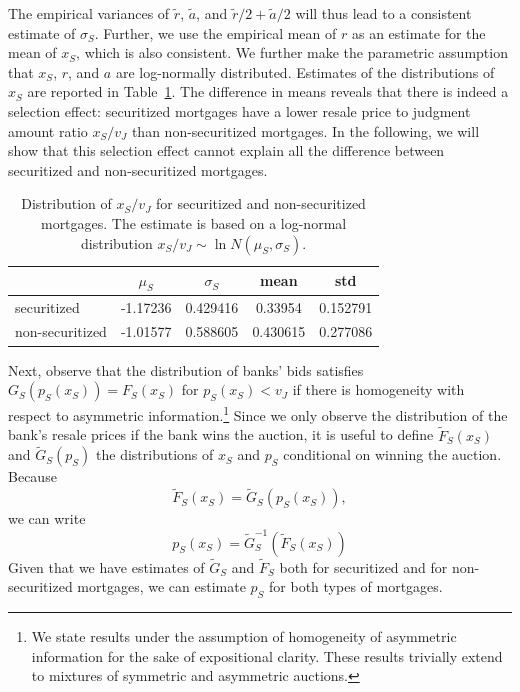 \documentclass[11pt,twopage]{article}
\begin{document}
The empirical variances of $\tilde r$, $\tilde a$, and $\tilde
r/2+\tilde a/2$ will thus lead to a consistent estimate of
$\sigma_S$. Further, we use the empirical mean of $r$ as an estimate
for the mean of $x_S$, which is also consistent. We further make the
parametric assumption that $x_S$, $r$, and $a$ are log-normally
distributed. Estimates of the distributions of $x_S$ are reported in
Table~\ref{tab:xs}. The difference in means reveals that there is
indeed a selection effect: securitized mortgages have a lower resale
price to judgment amount ratio $x_S/v_J$ than non-securitized
mortgages. In the following, we will show that this selection effect
cannot explain all the difference between securitized and
non-securitized mortgages.

\begin{table}
  \begin{center}
    \begin{tabular}{l|cc||cc}
      & $\mu_S$ & $\sigma_S$ & mean & std \\
      \hline
      securitized & -1.17236 & 0.429416 & 0.33954 & 0.152791 \\
      non-securitized & -1.01577 & 0.588605 & 0.430615 & 0.277086
    \end{tabular}
    \caption{Distribution of $x_S/v_J$ for securitized and non-securitized
      mortgages. The estimate is based on a log-normal distribution
      $x_S/v_J\sim \ln N(\mu_S,\sigma_S)$.\label{tab:xs}}
  \end{center}
\end{table}


Next, observe that the distribution of banks' bids satisfies
$G_S(p_S(x_S))=F_S(x_S)$ for $p_S(x_S)<v_J$ if there is homogeneity with respect to 
asymmetric information.\footnote{We state results under the assumption of
homogeneity of asymmetric information for the sake of expositional clarity. These
results trivially extend to mixtures of symmetric and asymmetric auctions.} Since we only observe the distribution of the
bank's resale prices if the bank wins the auction, it is useful to
define $\tilde F_S(x_S)$ and $\tilde G_S(p_S)$ the distributions of
$x_S$ and $p_S$ conditional on winning the auction.
Because \[ \tilde F_S(x_S) =\tilde G_S(p_S(x_S)), \]we can write
\[
p_S(x_S) = \tilde G_S^{-1}(\tilde F_S(x_S))
\]
Given that we have estimates of $\tilde G_S$ and $\tilde F_S$ both for
securitized and for non-securitized mortgages, we can estimate $p_S$
for both types of mortgages.
\end{document}
